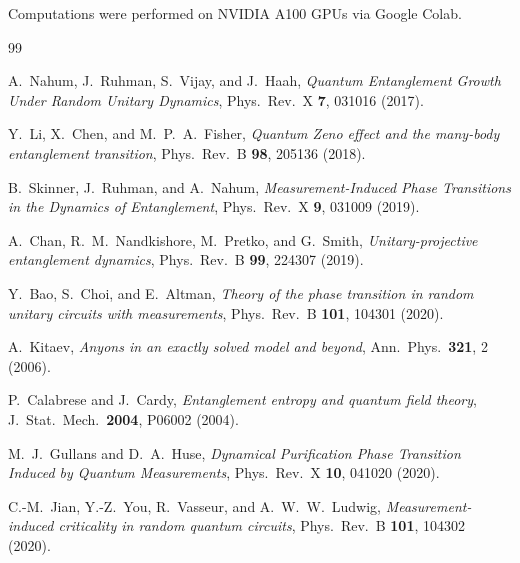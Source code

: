 \documentclass[twocolumn,aps,prx,10pt,floatfix]{revtex4-2}
\begin{document}
\begin{acknowledgments}
Computations were performed on NVIDIA A100 GPUs via Google Colab.
\end{acknowledgments}

\begin{thebibliography}{99}

A.~Nahum, J.~Ruhman, S.~Vijay, and J.~Haah,
\textit{Quantum Entanglement Growth Under Random Unitary Dynamics},
Phys.\ Rev.\ X \textbf{7}, 031016 (2017).

Y.~Li, X.~Chen, and M.~P.~A.~Fisher,
\textit{Quantum Zeno effect and the many-body entanglement transition},
Phys.\ Rev.\ B \textbf{98}, 205136 (2018).

B.~Skinner, J.~Ruhman, and A.~Nahum,
\textit{Measurement-Induced Phase Transitions in the Dynamics of Entanglement},
Phys.\ Rev.\ X \textbf{9}, 031009 (2019).

A.~Chan, R.~M.~Nandkishore, M.~Pretko, and G.~Smith,
\textit{Unitary-projective entanglement dynamics},
Phys.\ Rev.\ B \textbf{99}, 224307 (2019).

Y.~Bao, S.~Choi, and E.~Altman,
\textit{Theory of the phase transition in random unitary circuits with measurements},
Phys.\ Rev.\ B \textbf{101}, 104301 (2020).

A.~Kitaev,
\textit{Anyons in an exactly solved model and beyond},
Ann.\ Phys.\ \textbf{321}, 2 (2006).

P.~Calabrese and J.~Cardy,
\textit{Entanglement entropy and quantum field theory},
J.\ Stat.\ Mech.\ \textbf{2004}, P06002 (2004).

M.~J.~Gullans and D.~A.~Huse,
\textit{Dynamical Purification Phase Transition Induced by Quantum Measurements},
Phys.\ Rev.\ X \textbf{10}, 041020 (2020).

C.-M.~Jian, Y.-Z.~You, R.~Vasseur, and A.~W.~W.~Ludwig,
\textit{Measurement-induced criticality in random quantum circuits},
Phys.\ Rev.\ B \textbf{101}, 104302 (2020).

\end{thebibliography}
\end{document}
